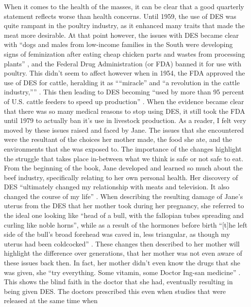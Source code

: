 \documentclass{article}
\begin{document}
When it comes to the health of the masses, it can be clear that a good
quarterly statement reflects worse than health concerns. Until 1959, the use
of DES was quite rampant in the poultry industry, as it enhanced many traits
that made the meat more desirable. At that point however, the issues with
DES became clear with ``dogs and males from low-income families in the South
were developing signs of feminization after eating cheap chicken parts and
wastes from processing plants'' \cite{ozeki1998my}, and the Federal Drug
Administration (or FDA) banned it for use with poultry. This didn't seem to
affect however when in 1954, the FDA approved the use of DES for cattle,
heralding it as ````miracle'' and ``a revolution in the cattle industry,''''
\cite{ozeki1998my}. This then leading to DES becoming ``used by more than 95
percent of U.S. cattle feeders to speed up production'' \cite{ozeki1998my}.
When the evidence became clear that there was so many medical reasons to
stop using DES, it still took the FDA until 1979 to actually ban it's use in
livestock production. As a reader, I felt very moved by these issues raised
and faced by Jane. The issues that she encountered were the resultant of the
choices her mother made, the food she ate, and the environments that she was
exposed to. The importance of the changes highlight the struggle that takes
place in-between what we think is safe or not safe to eat. From the
beginning of the book, Jane developed and learned so much about the beef
industry, specifically relating to her own personal health. Her discovery of
DES ``ultimately changed my relationship with meats and television. It also
changed the course of my life'' \cite{ozeki1998my}. When describing the
resulting damage of Jane's uterus from the DES that her mother took during
her pregnancy, she referred to the ideal one looking like ``head of a bull,
with the fallopian tubes spreading and curling like noble horns'', while as
a result of the hormones before birth ``[t]he left side of the bull’s broad
forehead was caved in, less triangular, as though my uterus had been
coldcocked'' \cite{ozeki1998my}. These changes then described to her mother
will highlight the difference over generations, that her mother was not even
aware of these issues back then. In fact, her mother didn't even know the
drugs that she was given, she ``try everything. Some vitamin, some Doctor
Ing-san medicine'' \cite{ozeki1998my}. This shows the blind faith in the
doctor that she had, eventually resulting in being given DES. The doctors
prescribed this even when studies that were released at the same time when
\end{document}
